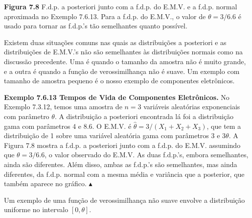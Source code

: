\textbf{Figura 7.8} F.d.p. a posteriori junto com a f.d.p. do E.M.V. e a f.d.p. normal aproximada no Exemplo 7.6.13. Para a f.d.p. do E.M.V., o valor de $\theta=3/6.6$ é usado para tornar as f.d.p.'s tão semelhantes quanto possível.

Existem duas situações comuns nas quais as distribuições a posteriori e as distribuições de E.M.V.'s não são semelhantes às distribuições normais como na discussão precedente. Uma é quando o tamanho da amostra não é muito grande, e a outra é quando a função de verossimilhança não é suave. Um exemplo com tamanho de amostra pequeno é o nosso exemplo de componentes eletrônicos.

\textbf{Exemplo 7.6.13 Tempos de Vida de Componentes Eletrônicos.} No Exemplo 7.3.12, temos uma amostra de $n=3$ variáveis aleatórias exponenciais com parâmetro $\theta$. A distribuição a posteriori encontrada lá foi a distribuição gama com parâmetros 4 e 8.6. O E.M.V. é $\hat{\theta} = 3/(X_1+X_2+X_3)$, que tem a distribuição de 1 sobre uma variável aleatória gama com parâmetros 3 e $3\theta$. A Figura 7.8 mostra a f.d.p. a posteriori junto com a f.d.p. do E.M.V. assumindo que $\theta=3/6.6$, o valor observado do E.M.V. As duas f.d.p.'s, embora semelhantes, ainda são diferentes. Além disso, ambas as f.d.p.'s são semelhantes, mas ainda diferentes, da f.d.p. normal com a mesma média e variância que a posterior, que também aparece no gráfico. $\blacktriangle$

Um exemplo de uma função de verossimilhança não suave envolve a distribuição uniforme no intervalo $[0, \theta]$.


